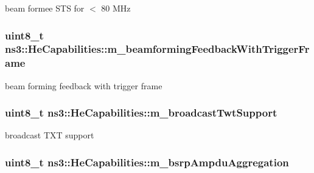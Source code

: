 beam formee S\+TS for $<$ 80 M\+Hz 

\subsubsection[{\texorpdfstring{m\+\_\+beamforming\+Feedback\+With\+Trigger\+Frame}{m_beamformingFeedbackWithTriggerFrame}}]{\setlength{\rightskip}{0pt plus 5cm}uint8\+\_\+t ns3\+::\+He\+Capabilities\+::m\+\_\+beamforming\+Feedback\+With\+Trigger\+Frame\hspace{0.3cm}{\ttfamily [private]}}\hypertarget{classns3_1_1HeCapabilities_a67342083f99cbe908d4bc37499f07830}{}\label{classns3_1_1HeCapabilities_a67342083f99cbe908d4bc37499f07830}


beam forming feedback with trigger frame 

\subsubsection[{\texorpdfstring{m\+\_\+broadcast\+Twt\+Support}{m_broadcastTwtSupport}}]{\setlength{\rightskip}{0pt plus 5cm}uint8\+\_\+t ns3\+::\+He\+Capabilities\+::m\+\_\+broadcast\+Twt\+Support\hspace{0.3cm}{\ttfamily [private]}}\hypertarget{classns3_1_1HeCapabilities_a4624bbde1e282a55475c95e392f025cf}{}\label{classns3_1_1HeCapabilities_a4624bbde1e282a55475c95e392f025cf}


broadcast T\+XT support 

\subsubsection[{\texorpdfstring{m\+\_\+bsrp\+Ampdu\+Aggregation}{m_bsrpAmpduAggregation}}]{\setlength{\rightskip}{0pt plus 5cm}uint8\+\_\+t ns3\+::\+He\+Capabilities\+::m\+\_\+bsrp\+Ampdu\+Aggregation\hspace{0.3cm}{\ttfamily [private]}}\hypertarget{classns3_1_1HeCapabilities_a8d3e6a7eb38f1e4d97b06feb5f16c114}{}\label{classns3_1_1HeCapabilities_a8d3e6a7eb38f1e4d97b06feb5f16c114}


